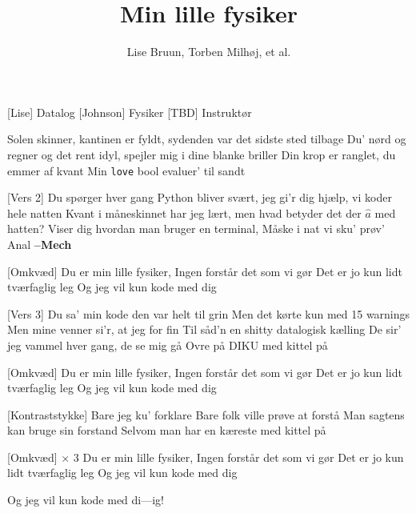 \documentclass{article}
\title{Min lille fysiker}
\author{Lise Bruun, Torben Milhøj, et al.}
\newcommand{\omkvaed}{%
    \sings{D} Du er min lille fysiker,
    \sings{F} Ingen forstår det som vi gør
    \sings{D, F} Det er jo kun lidt tværfaglig leg
    \sings{D, F} Og jeg vil kun kode med dig
}
\begin{document}
                
\maketitle

\begin{roles}
[Lise] Datalog
[Johnson] Fysiker
[TBD] Instruktør
\end{roles}




\begin{song}
[Vers 1]
%
Solen skinner, kantinen er fyldt, sydenden var det sidste sted tilbage
Du' nørd og regner og det rent idyl, spejler mig i dine blanke briller
Din krop er ranglet, du emmer af kvant
Min \texttt{love} bool evaluer' til sandt

[Vers 2]
%
Du spørger hver gang Python bliver svært, jeg gi'r dig hjælp, vi koder hele natten
Kvant i måneskinnet har jeg lært, men hvad betyder det der $\hat{a}$ med hatten?
Viser dig hvordan man bruger en terminal,
Måske i nat vi sku' prøv' Anal \textbf{--Mech}

[Omkvæd]
 Du er min lille fysiker,
 Ingen forstår det som vi gør
 Det er jo kun lidt tværfaglig leg
 Og jeg vil kun kode med dig

[Vers 3]
%
Du sa' min kode den var helt til grin
Men det kørte kun med 15 warnings
Men mine venner si'r, at jeg for fin
Til såd'n en shitty datalogisk kælling
De sir' jeg vammel hver gang, de se mig gå
Ovre på DIKU med kittel på

\newpage

[Omkvæd]
\omkvaed{}

[Kontraststykke]
 Bare jeg ku' forklare
 Bare folk ville prøve at forstå
 Man sagtens kan bruge sin forstand
 Selvom man har en kæreste med kittel på

[Omkvæd] $\times$ 3
\omkvaed{}

Og jeg vil kun kode med di---ig!

\end{song}
\end{document}
